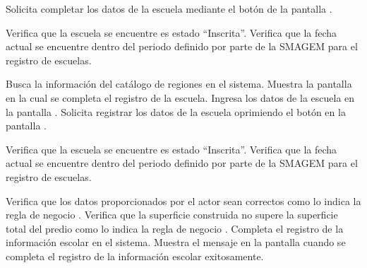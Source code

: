  \begin{UCtrayectoria}
    \UCpaso[\UCactor] Solicita completar los datos de la escuela mediante el botón  de la pantalla .
    
    \UCpaso[\UCsist] Verifica que la escuela se encuentre es estado ``Inscrita''. 
    \UCpaso[\UCsist] Verifica que la fecha actual se encuentre dentro del periodo definido por parte de la SMAGEM para el registro de escuelas. 
    
    \UCpaso[\UCsist] Busca la información del catálogo de regiones en el sistema. 
    \UCpaso[\UCsist] Muestra la pantalla  en la cual se completa el registro de la escuela.
    \UCpaso[\UCactor] Ingresa los datos de la escuela en la pantalla . \label{cur6:Acciones}
    \UCpaso[\UCactor] Solicita registrar los datos de la escuela oprimiendo el botón  en la pantalla . 

    \UCpaso[\UCsist] Verifica que la escuela se encuentre es estado ``Inscrita''. 
    \UCpaso[\UCsist] Verifica que la fecha actual se encuentre dentro del periodo definido por parte de la SMAGEM para el registro de escuelas. 

    \UCpaso[\UCsist] Verifica que los datos proporcionados por el actor sean correctos como lo indica la regla de negocio .     
    \UCpaso[\UCsist] Verifica que la superficie construida no supere la superficie total del predio como lo indica la regla de negocio . 
    \UCpaso[\UCsist] Completa el registro de la información escolar en el sistema.\label{cur6:termina}
    \UCpaso[\UCsist] Muestra el mensaje  en la pantalla  cuando se completa el registro de la información escolar exitosamente. 
 \end{UCtrayectoria}

